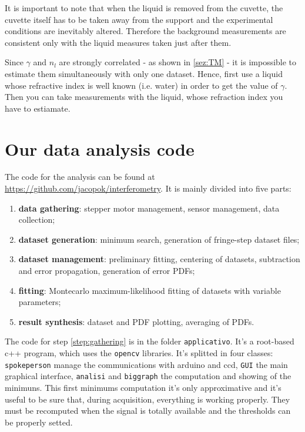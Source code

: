 \documentclass[a4paper, 12pt]{article}
\begin{document}
It is important to note that when the liquid is removed from the cuvette, the cuvette itself has to be taken away from the support and the experimental conditions are inevitably altered. Therefore the background measurements are consistent only with the liquid measures taken just after them.

Since $\gamma$ and $n_l$ are strongly correlated - as shown in \ref{sez:TM} - it is impossible to estimate them simultaneously with only one dataset. Hence, first use a liquid whose refractive index is well known (i.e. water) in order to get the value of $\gamma$. Then you can take measurements with the liquid, whose refraction index you have to estiamate.

\section{Our data analysis code}
The code for the analysis can be found at \url{https://github.com/jacopok/interferometry}. It is mainly divided into five parts:

\begin{enumerate}
    \item \textbf{data gathering}: stepper motor management, sensor management, data collection; \label{step:gathering}
    \item \textbf{dataset generation}: minimum search, generation of fringe-step dataset files; \label{step:generation}
    \item \textbf{dataset management}: preliminary fitting, centering of datasets, subtraction and error propagation, generation of error PDFs; \label{step:management}
    \item \textbf{fitting}: Montecarlo maximum-likelihood fitting of datasets with variable parameters; \label{step:fitting}
    \item \textbf{result synthesis}: dataset and PDF plotting, averaging of PDFs. \label{step:synthesis}
\end{enumerate}

The code for step \ref{step:gathering} is in the folder \lstinline{applicativo}. It's a root-based c++ program, which uses the \lstinline{opencv} libraries. It's splitted in four classes: \lstinline{spokeperson} manage the communications with arduino and ccd, \lstinline{GUI} the main graphical interface, \lstinline{analisi} and \lstinline{biggraph} the computation and showing of the minimuns. This first minimums computation it's only approximative and it's useful to be sure that, during acquisition, everything is working properly. They must be recomputed when the signal is totally available and the thresholds can be properly setted.
\end{document}
